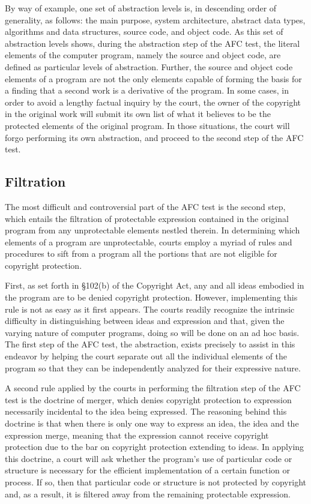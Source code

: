 By way of example, one set of abstraction levels is, in descending order
of generality, as follows: the main purpose, system architecture, abstract
data types, algorithms and data structures, source code, and object
code. As this set of abstraction levels shows, during the abstraction step
of the AFC test, the literal elements of the computer program, namely the
source and object code, are defined as particular levels of
abstraction. Further, the source and object code elements of a program are
not the only elements capable of forming the basis for a finding that a
second work is a derivative of the program. In some cases, in order to
avoid a lengthy factual inquiry by the court, the owner of the copyright in
the original work will submit its own list of what it believes to be the
protected elements of the original program. In those situations, the court
will forgo performing its own abstraction, and proceed to the second step of
the AFC test.

\subsection{Filtration}

The most difficult and controversial part of the AFC test is the second
step, which entails the filtration of protectable expression contained in
the original program from any unprotectable elements nestled therein. In
determining which elements of a program are unprotectable, courts employ a
myriad of rules and procedures to sift from a program all the portions
that are not eligible for copyright protection.

First, as set forth in \S 102(b) of the Copyright Act, any and all ideas
embodied in the program are to be denied copyright protection. However,
implementing this rule is not as easy as it first appears. The courts
readily recognize the intrinsic difficulty in distinguishing between ideas
and expression and that, given the varying nature of computer programs,
doing so will be done on an ad hoc basis. The first step of the AFC test,
the abstraction, exists precisely to assist in this endeavor by helping
the court separate out all the individual elements of the program so that
they can be independently analyzed for their expressive nature.

A second rule applied by the courts in performing the filtration step of
the AFC test is the doctrine of merger, which denies copyright protection
to expression necessarily incidental to the idea being expressed. The
reasoning behind this doctrine is that when there is only one way to
express an idea, the idea and the expression merge, meaning that the
expression cannot receive copyright protection due to the bar on copyright
protection extending to ideas. In applying this doctrine, a court will ask
whether the program's use of particular code or structure is necessary for
the efficient implementation of a certain function or process. If so, then
that particular code or structure is not protected by copyright and, as a
result, it is filtered away from the remaining protectable expression.

